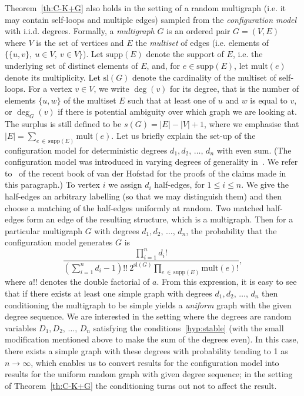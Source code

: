 \documentclass[AHL,Unicode,longabstracts,published]{cedram}
\newcommand{\supp}{\mathrm{supp}}
\newcommand{\sll}{\mathrm{sl}}
\newcommand{\mult}{\mathrm{mult}}
\begin{document}
Theorem~\ref{th:C-K+G} also holds in the setting of a random multigraph (i.e. it may contain self-loops and multiple edges) sampled from the \emph{configuration model} with i.i.d. degrees. Formally, a \emph{multigraph} $G$ is an ordered pair $G = (V,E)$ where $V$ is the set of vertices and $E$ the \emph{multiset} of edges (i.e. elements of $\{\{u,v\},\ u\in V,\ v\in V\}$). Let $\supp(E)$ denote the support of $E$, i.e. the underlying set of distinct elements of $E$, and, for $e \in \supp(E)$, let $\mult(e)$ denote its multiplicity. Let $\sll(G)$ denote the cardinality of the multiset of self-loops. For a vertex $v \in V$, we write $\deg(v)$ for its degree, that is the number of elements $\{u,w\}$ of the multiset $E$ such that at least one of $u$ and $w$ is equal to $v$, or $\deg_G(v)$ if there is potential ambiguity over which graph we are looking at. The surplus is still defined to be $s(G)=|E|-|V|+1$, where we emphasise that $|E| = \sum_{e\,\in\, \supp(E)} \mult(e)$. Let us briefly explain the set-up of the configuration model for deterministic degrees $d_1, d_2,\,\ldots,\,d_n$ with even sum. (The configuration model was introduced in varying degrees of generality in~\cite{BenderCanfield, Bollobas, Wormald}. We refer to~\cite[Chapter~7]{RvdH} of the recent book of van der Hofstad for the proofs of the claims made in this paragraph.) To vertex $i$ we assign $d_i$ half-edges, for $1 \le i \le n$. We give the half-edges an arbitrary labelling (so that we may distinguish them) and then choose a matching of the half-edges uniformly at random. Two matched half-edges form an edge of the resulting structure, which is a multigraph. Then for a particular multigraph $G$ with degrees $d_1, d_2,\,\ldots,\,d_n$, the probability that the configuration model generates $G$ is
\begin{equation}\label{eqn:config}
\frac{\prod\limits_{i=1}^n d_i!}{\left(\sum\limits_{i=1}^n d_i - 1\right)!! \ 2^{\sll(G)} \prod\limits_{e\,\in \,\supp(E)} \mult(e)!},
\end{equation}
where $a!!$ denotes the double factorial of $a$. From this expression, it is easy to see that if there exists at least one simple graph with degrees $d_1, d_2,\,\ldots,\,d_n$ then conditioning the multigraph to be simple yields a \emph{uniform} graph with the given degree sequence. We are interested in the setting where the degrees are random variables $D_1, D_2,\,\ldots,\,D_n$ satisfying the conditions~\eqref{hyp:stable} (with the small modification mentioned above to make the sum of the degrees even). In this case, there exists a simple graph with these degrees with probability tending to 1 as $n \to \infty$, which enables us to convert results for the configuration model into results for the uniform random graph with given degree sequence; in the setting of Theorem~\ref{th:C-K+G} the conditioning turns out not to affect the result.
\end{document}
